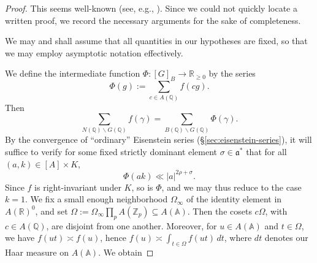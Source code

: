 \begin{proof}
  This seems well-known (see, e.g., \cite[\S7.6]{MR1694894}).  Since we could not quickly locate a written proof, we record the necessary arguments for the sake of completeness.


  We may and shall assume that all quantities in our hypotheses are fixed, so that we may employ asymptotic notation effectively.

  We define the intermediate function $\Phi : [G]_B \rightarrow \mathbb{R}_{\geq 0}$ by the series
  \begin{equation*}
    \Phi(g) := \sum_{c \in A(\mathbb{Q})} f(c g).
  \end{equation*}
  Then
  \begin{equation*}
    \sum_{N(\mathbb{Q}) \backslash G(\mathbb{Q})} f(\gamma) = \sum_{B(\mathbb{Q}) \backslash G(\mathbb{Q})} \Phi(\gamma).
  \end{equation*}
  By the convergence of ``ordinary'' Eisenstein series (\S\ref{sec:eisenstein-series}), it will suffice to verify for some fixed strictly dominant element $\sigma \in \mathfrak{a}^*$ that for all $(a,k) \in [A] \times K$,
  \begin{equation}\label{eq:phia-k-ll}
    \Phi(a k) \ll |a|^{2 \rho + \sigma}.
  \end{equation}
  Since $f$ is right-invariant under $K$, so is $\Phi$, and we may thus reduce to the case $k = 1$.  We fix a small enough neighborhood $\Omega_\infty$ of the identity element in $A(\mathbb{R})^0$, and set $\Omega := \Omega_\infty \prod_p A(\mathbb{Z}_p) \subseteq A(\mathbb{A})$.  Then the cosets $c \Omega$, with $c \in A(\mathbb{Q})$, are disjoint from one another.  Moreover, for $u \in A(\mathbb{A})$ and $t \in \Omega$, we have $f(u t) \asymp f(u)$, hence $f(u) \asymp \int_{t \in \Omega } f(u t) \, d t$, where $d t$ denotes our Haar measure on $A(\mathbb{A})$.  We obtain


\end{proof}
